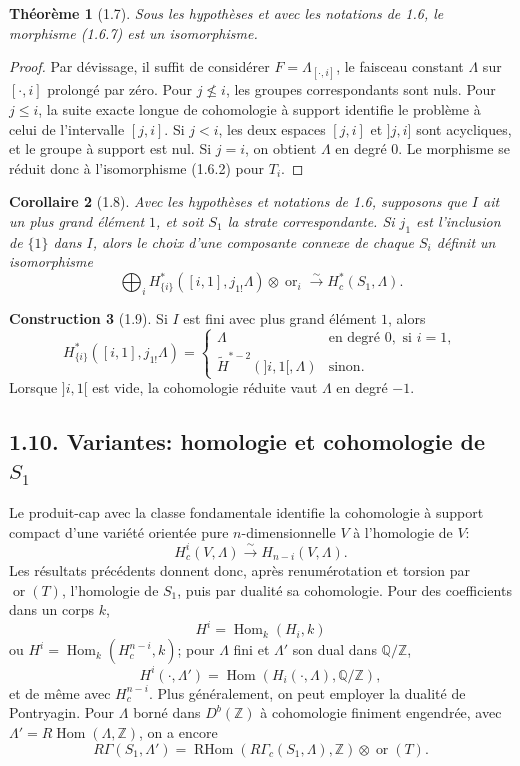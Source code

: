 \documentclass[11pt]{article}
\newtheorem{theorem}{Théorème}[section]
\newtheorem{corollary}[theorem]{Corollaire}
\theoremstyle{definition}
\newtheorem{construction}[theorem]{Construction}
\newcommand{\ZZ}{\mathbb Z}
\newcommand{\QQ}{\mathbb Q}
\newcommand{\Hom}{\operatorname{Hom}}
\newcommand{\RHom}{\operatorname{RHom}}
\newcommand{\ornt}{\operatorname{or}}
\begin{document}
\begin{theorem}[1.7]
Sous les hypothèses et avec les notations de 1.6, le morphisme (1.6.7) est un isomorphisme.
\end{theorem}
\begin{proof}
Par dévissage, il suffit de considérer $F=\Lambda_{[\cdot,i]}$, le faisceau constant $\Lambda$ sur $[\cdot,i]$ prolongé par zéro. Pour $j\nleq i$, les groupes correspondants sont nuls. Pour $j\leq i$, la suite exacte longue de cohomologie à support identifie le problème à celui de l'intervalle $[j,i]$. Si $j<i$, les deux espaces $[j,i]$ et $]j,i]$ sont acycliques, et le groupe à support est nul. Si $j=i$, on obtient $\Lambda$ en degré $0$. Le morphisme se réduit donc à l'isomorphisme (1.6.2) pour $T_i$.
\end{proof}

\begin{corollary}[1.8]
Avec les hypothèses et notations de 1.6, supposons que $I$ ait un plus grand élément $1$, et soit $S_1$ la strate correspondante. Si $j_1$ est l'inclusion de $\{1\}$ dans $I$, alors le choix d'une composante connexe de chaque $S_i$ définit un isomorphisme
\begin{equation}
\bigoplus_i H^*_{\{i\}}([i,1],j_{1!}\Lambda)\otimes\ornt_i\xrightarrow{\sim}H_c^*(S_1,\Lambda).\tag{1.8.1}
\end{equation}
\end{corollary}

\begin{construction}[1.9]
Si $I$ est fini avec plus grand élément $1$, alors
\[
H^*_{\{i\}}([i,1],j_{1!}\Lambda)=
\begin{cases}
\Lambda & \text{en degré }0,\text{ si }i=1,\\
\widetilde H^{*-2}(]i,1[,\Lambda) & \text{sinon.}
\end{cases}
\]
Lorsque $]i,1[$ est vide, la cohomologie réduite vaut $\Lambda$ en degré $-1$.
\end{construction}

\subsection*{1.10. Variantes: homologie et cohomologie de $S_1$}
Le produit-cap avec la classe fondamentale identifie la cohomologie à support compact d'une variété orientée pure $n$-dimensionnelle $V$ à l'homologie de $V$:
\[
H_c^i(V,\Lambda)\xrightarrow{\sim}H_{n-i}(V,\Lambda).
\]
Les résultats précédents donnent donc, après renumérotation et torsion par $\ornt(T)$, l'homologie de $S_1$, puis par dualité sa cohomologie. Pour des coefficients dans un corps $k$,
\[
H^i=\Hom_k(H_i,k)
\]
ou $H^i=\Hom_k(H_c^{n-i},k)$; pour $\Lambda$ fini et $\Lambda'$ son dual dans $\QQ/\ZZ$,
\[
H^i(\cdot,\Lambda')=\Hom(H_i(\cdot,\Lambda),\QQ/\ZZ),
\]
et de même avec $H_c^{n-i}$. Plus généralement, on peut employer la dualité de Pontryagin. Pour $\Lambda$ borné dans $D^b(\ZZ)$ à cohomologie finiment engendrée, avec $\Lambda'=R\Hom(\Lambda,\ZZ)$, on a encore
\[
R\Gamma(S_1,\Lambda')=\RHom(R\Gamma_c(S_1,\Lambda),\ZZ)\otimes\ornt(T).
\]
\end{document}

